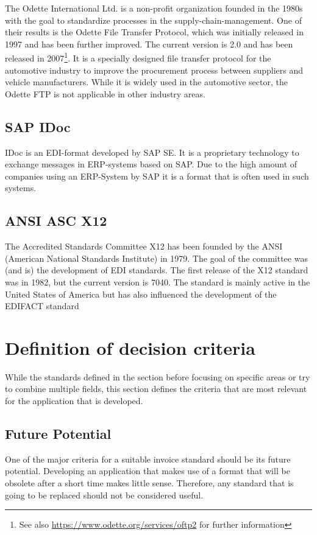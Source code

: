 The Odette International Ltd. is a non-profit organization founded in the 1980s with the goal to standardize processes in the supply-chain-management. One of their results is the Odette File Transfer Protocol, which was initially released in 1997 and has been further improved. The current version is 2.0 and has been released in 2007\footnote{See also \url{https://www.odette.org/services/oftp2} for further information}. It is a specially designed file transfer protocol for the automotive industry to improve the procurement process between suppliers and vehicle manufacturers. While it is widely used in the automotive sector, the Odette FTP is not applicable in other industry areas.

\subsection{SAP IDoc}
\label{sec2.1.6}

IDoc is an EDI-format developed by SAP SE. It is a proprietary technology to exchange messages in ERP-systems based on SAP. Due to the high amount of companies using an ERP-System by SAP it is a format that is often used in such systems.

\subsection{ANSI ASC X12}
\label{sec2.1.7}

The Accredited Standards Committee X12 has been founded by the ANSI (American National Standards Institute) in 1979. The goal of the committee was (and is) the development of EDI standards. The first release of the X12 standard was in 1982, but the current version is 7040. The standard is mainly active in the United States of America but has also influenced the development of the EDIFACT standard

\section{Definition of decision criteria}
\label{sec2.2}

While the standards defined in the section before focusing on specific areas or try to combine multiple fields, this section defines the criteria that are most relevant for the application that is developed.

\subsection{Future Potential}
\label{sec2.2.1}
One of the major criteria for a suitable invoice standard should be its future potential. Developing an application that makes use of a format that will be obsolete after a short time makes little sense. Therefore, any standard that is going to be replaced should not be considered useful.

